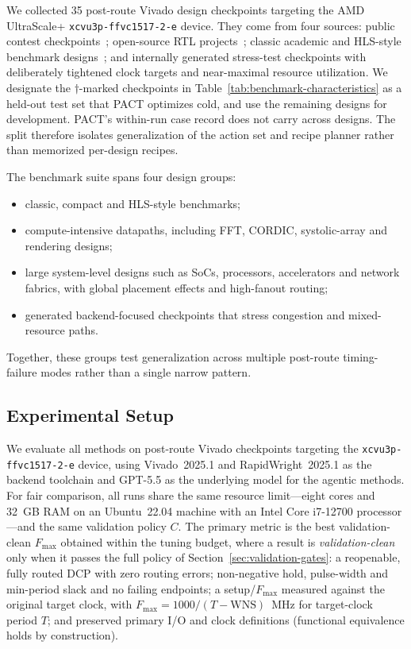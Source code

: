 \documentclass[conference]{IEEEtran}
\begin{document}
We collected 35 post-route Vivado design checkpoints targeting the AMD
UltraScale+ \texttt{xcvu3p-ffvc1517-2-e} device. They come from four
sources: public contest
checkpoints~\cite{xilinx_fpl26_optimization_contest_2026}; open-source
RTL projects~\cite{corundum_repo, vca_epfl_fsa, nvidia_nvdla_hw,
vortex_repo, secworks_aes, zipcpu_dblclockfft, openrisc_or1200,
opencores_cordic}; classic academic and HLS-style benchmark
designs~\cite{vtr_benchmarks}; and internally generated stress-test
checkpoints with deliberately tightened clock targets and near-maximal
resource utilization. We designate the
$\dagger$-marked checkpoints in Table~\ref{tab:benchmark-characteristics}
as a held-out test set that PACT optimizes cold, and use the remaining
designs for development. PACT's within-run case record does not carry
across designs. The split therefore isolates generalization of
the action set and recipe planner rather than memorized per-design
recipes.

The benchmark suite spans four design groups:
\begin{itemize}
\item classic, compact and HLS-style benchmarks;
\item compute-intensive datapaths, including FFT, CORDIC,
systolic-array and rendering designs;
\item large system-level designs such as SoCs, processors,
accelerators and network fabrics, with global placement effects and
high-fanout routing;
\item generated backend-focused checkpoints that stress congestion
and mixed-resource paths.
\end{itemize}
Together, these groups test generalization across multiple
post-route timing-failure modes rather than a single narrow pattern.


\subsection{Experimental Setup}
\label{sec:experimental-setup}

We evaluate all methods on post-route Vivado checkpoints targeting the
\texttt{xcvu3p-ffvc1517-2-e} device, using Vivado~2025.1 and
RapidWright~2025.1 as the backend toolchain and GPT-5.5 as the
underlying model for the agentic methods. For fair comparison, all runs share the same resource limit---eight cores and 32~GB RAM on an Ubuntu~22.04 machine with an Intel Core i7-12700 processor---and the same validation policy $C$. The primary metric is the best validation-clean $F_{\max}$ obtained within the tuning budget, where a result is \emph{validation-clean} only when it passes the full policy of Section~\ref{sec:validation-gates}: a reopenable, fully routed DCP with zero routing errors; non-negative hold, pulse-width and min-period slack and no failing endpoints; a setup/$F_{\max}$ measured against the original target clock, with $F_{\max}=1000/(T-\mathrm{WNS})$~MHz for target-clock period $T$; and preserved primary I/O and clock definitions (functional equivalence holds by construction).
\end{document}
